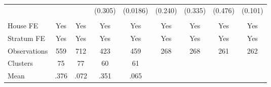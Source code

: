 {\begin{tabular}{l*{8}{c}}
                &         &         &  (0.305)& (0.0186)&  (0.240)&  (0.335)&  (0.476)&  (0.101)\\
                &         &         &         &         &         &         &         &         \\
House FE        &      Yes&      Yes&      Yes&      Yes&      Yes&      Yes&      Yes&      Yes\\
Stratum FE      &      Yes&      Yes&      Yes&      Yes&      Yes&      Yes&      Yes&      Yes\\
\midrule
Observations    &      559&      712&      423&      459&      268&      268&      261&      262\\
Clusters        &       75&       77&       60&       61&         &         &         &         \\
Mean            &     .376&     .072&     .351&     .065&         &         &         &         \\
\bottomrule
\end{tabular}
}
